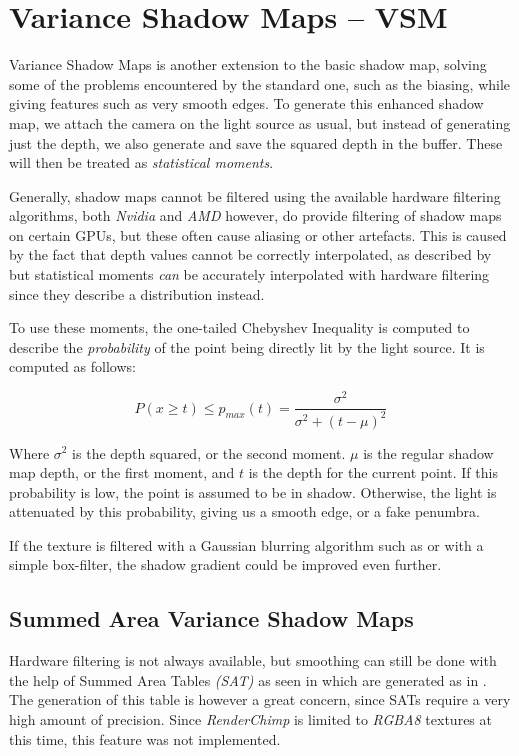 \documentclass{acmsiggraph}               %
\begin{document}
\section{Variance Shadow Maps -- VSM}
\label{sec:vsm}
Variance Shadow Maps is another extension to the basic shadow map, solving some of the problems encountered by the standard one, such as the biasing, while giving features such as very smooth edges. To generate this enhanced shadow map, we attach the camera on the light source as usual, but instead of generating just the depth, we also generate and save the squared depth in the buffer. These will then be treated as \emph{statistical moments}.

Generally, shadow maps cannot be filtered using the available hardware filtering algorithms, both \emph{Nvidia} and \emph{AMD} however, do provide filtering of shadow maps on certain GPUs, but these often cause aliasing or other artefacts. This is caused by the fact that depth values cannot be correctly interpolated, as described by \cite{VSM2006} but statistical moments \emph{can} be accurately interpolated with hardware filtering since they describe a distribution instead.

To use these moments, the one-tailed Chebyshev Inequality is computed to describe the \emph{probability} of the point being directly lit by the light source. It is computed as follows:

\begin{equation}
	P(x \geq t) \leq p_{max}(t) = \frac{\sigma^2}{\sigma^2 + (t - \mu)^2}
\end{equation}

Where $\sigma^2$ is the depth squared, or the second moment. $\mu$ is the regular shadow map depth, or the first moment, and $t$ is the depth for the current point. If this probability is low, the point is assumed to be in shadow. Otherwise, the light is attenuated by this probability, giving us a smooth edge, or a fake penumbra.

If the texture is filtered with a Gaussian blurring algorithm such as \cite{GGGauss07} or with a simple box-filter, the shadow gradient could be improved even further.

\subsection{Summed Area Variance Shadow Maps}
Hardware filtering is not always available, but smoothing can still be done with the help of Summed Area Tables \emph{(SAT)} as seen in \cite{GGVSM07} which are generated as in \cite{FSAT05}. The generation of this table is however a great concern, since SATs require a very high amount of precision. Since \emph{RenderChimp} is limited to \emph{RGBA8} textures at this time, this feature was not implemented.
\end{document}
